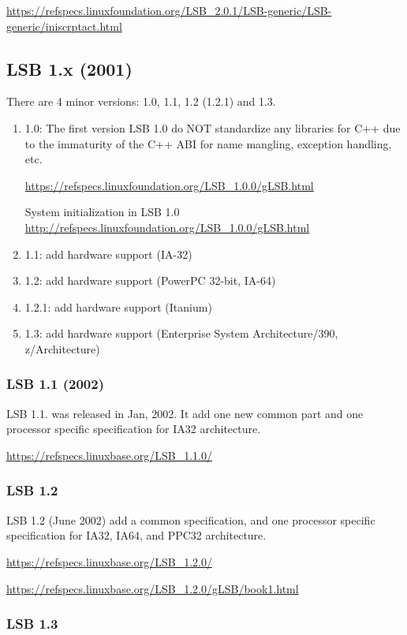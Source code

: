 \url{https://refspecs.linuxfoundation.org/LSB_2.0.1/LSB-generic/LSB-generic/iniscrptact.html}

\subsection{LSB 1.x (2001)}

There are 4 minor versions: 1.0, 1.1, 1.2 (1.2.1) and 1.3.
\begin{enumerate}
  \item 1.0: The first version LSB 1.0 do NOT standardize any libraries for C++ due to the
immaturity of the C++ ABI for name mangling, exception handling, etc.

\url{https://refspecs.linuxfoundation.org/LSB_1.0.0/gLSB.html}

System initialization in LSB 1.0
\url{http://refspecs.linuxfoundation.org/LSB_1.0.0/gLSB.html}
 
   \item 1.1: add hardware support (IA-32)
   \item 1.2: add hardware support (PowerPC 32-bit, IA-64)
   \item 1.2.1: add hardware support (Itanium)
   \item 1.3: add hardware support (Enterprise System Architecture/390,
   z/Architecture)
\end{enumerate}


\subsubsection{LSB 1.1 (2002)}

LSB 1.1. was released in Jan, 2002. It add one new common part and one
processor specific specification for IA32 architecture.

\url{https://refspecs.linuxbase.org/LSB_1.1.0/}

\subsubsection{LSB 1.2}

LSB 1.2 (June 2002) add a common specification, and one processor specific
specification for IA32, IA64, and PPC32 architecture.

\url{https://refspecs.linuxbase.org/LSB_1.2.0/}

\url{https://refspecs.linuxbase.org/LSB_1.2.0/gLSB/book1.html}

\subsubsection{LSB 1.3 }

